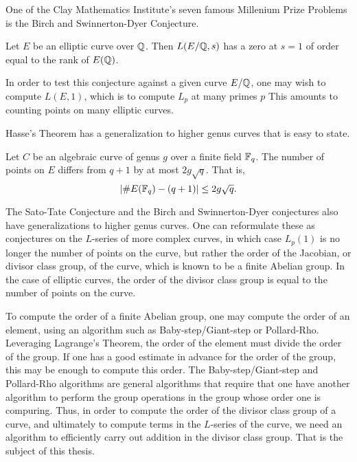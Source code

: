 One of the Clay Mathematics Institute's seven famous Millenium Prize Problems
is the Birch and Swinnerton-Dyer Conjecture.

\begin{conjecture}
  Let $E$ be an elliptic curve over $\mathbb{Q}$.
  Then $L(E/\mathbb{Q}, s)$ has a zero at $s = 1$ of order equal to the rank of $E(\mathbb{Q})$.
\end{conjecture}

In order to test this conjecture against a given curve $E/\mathbb{Q}$,
one may wish to compute $L(E, 1)$, which is to compute $L_p$ at many primes $p$
This amounts to counting points on many elliptic curves.

Hasse's Theorem has a generalization to higher genus curves that is easy to state.
\begin{theorem}
  Let $C$ be an algebraic curve of genus $g$ over a finite field $\mathbb{F}_q$.
  The number of points on $E$ differs from $q + 1$ by at most $2g \sqrt q$.
  That is,
  \[ | \#E(\mathbb{F}_q) - (q + 1) | \leq 2g \sqrt q. \]
\end{theorem}

The Sato-Tate Conjecture and the Birch and Swinnerton-Dyer conjectures
also have generalizations to higher genus curves.
One can reformulate these as conjectures on the $L$-series of more complex curves,
in which case $L_p(1)$ is no longer the number of points on the curve,
but rather the order of the Jacobian, or divisor class group, of the curve,
which is known to be a finite Abelian group.
In the case of elliptic curves, the order of the divisor class group is
equal to the number of points on the curve.

To compute the order of a finite Abelian group, one may compute the order of an element,
using an algorithm such as Baby-step/Giant-step or Pollard-Rho.
Leveraging Lagrange's Theorem, the order of the element must divide the order of the group.
If one has a good estimate in advance for the order of the group, this may be enough
to compute this order.
The Baby-step/Giant-step and Pollard-Rho algorithms are general algorithms that
require that one have another algorithm to perform the group operations in the group
whose order one is compuring.
Thus, in order to compute the order of the divisor class group of a curve,
and ultimately to compute terms in the $L$-series of the curve,
we need an algorithm to efficiently carry out addition in the divisor class group.
That is the subject of this thesis.

